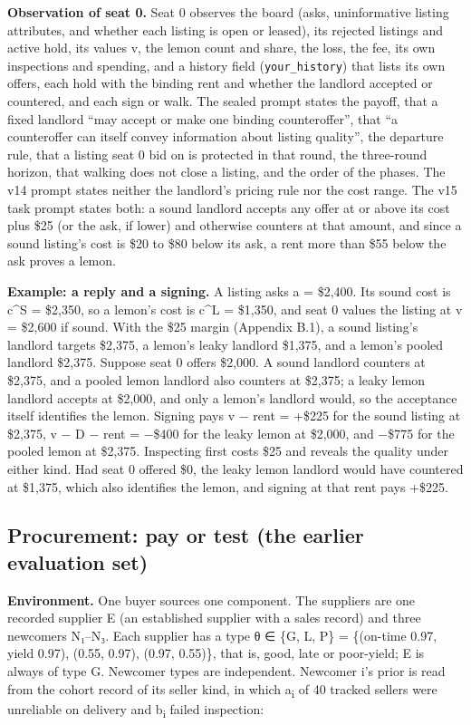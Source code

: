 \textbf{Observation of seat 0.} Seat 0 observes the board (asks, uninformative listing attributes, and whether each
listing is open or leased), its rejected listings and active hold, its values v, the lemon count and share, the
loss, the fee, its own inspections and spending, and a history field (\texttt{your\_\allowbreak{}history}) that lists its own offers,
each hold with the binding rent and whether the landlord accepted or countered, and each sign or walk. The sealed
prompt states the payoff, that a fixed landlord ``may accept or make one binding counteroffer'',
that ``a counteroffer can itself convey information about listing quality'', the departure rule,
that a listing seat 0 bid on is protected in that round, the three-round horizon, that walking does
not close a listing, and the order of the phases. The v14 prompt states neither the landlord's pricing
rule nor the cost range. The v15 task prompt states both: a sound landlord accepts any offer at or above its cost
plus \$25 (or the ask, if lower) and otherwise counters at that amount, and since a sound listing's cost is \$20 to \$80
below its ask, a rent more than \$55 below the ask proves a lemon.

\textbf{Example: a reply and a signing.} A listing asks a = \$2,400. Its sound cost is c\^{}S = \$2,350, so
a lemon's cost is c\^{}L = \$1,350, and seat 0 values the listing at v = \$2,600 if sound. With the \$25 margin
(Appendix B.1), a sound listing's landlord targets \$2,375, a lemon's leaky landlord \$1,375, and a lemon's
pooled landlord \$2,375. Suppose seat 0 offers \$2,000. A sound landlord counters at \$2,375, and a pooled lemon
landlord also counters at \$2,375; a leaky lemon landlord accepts at \$2,000, and only a lemon's
landlord would, so the acceptance itself identifies the lemon. Signing pays v − rent = +\$225 for the
sound listing at \$2,375, v − D − rent = −\$400 for the leaky lemon at \$2,000, and −\$775 for the
pooled lemon at \$2,375. Inspecting first costs \$25 and reveals the quality under either kind. Had
seat 0 offered \$0, the leaky lemon landlord would have countered at \$1,375, which also identifies the
lemon, and signing at that rent pays +\$225.

\subsection{Procurement: pay or test (the earlier evaluation set)}\label{procurement-pay-or-test-the-earlier-evaluation-set}

\textbf{Environment.} One buyer sources one component. The suppliers are one recorded supplier E (an established
supplier with a sales record) and three newcomers N₁--N₃. Each supplier has a type θ ∈ \{G, L, P\} = \{(on-time 0.97,
yield 0.97), (0.55, 0.97), (0.97, 0.55)\}, that is, good, late or poor-yield; E is always of type G. Newcomer types
are independent. Newcomer i's prior is read from the cohort record of its seller kind, in which a\textsubscript{i} of 40 tracked
sellers were unreliable on delivery and b\textsubscript{i} failed inspection:

